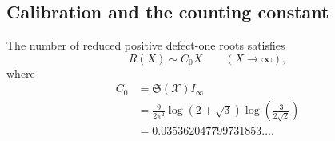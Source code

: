 \subsection{Calibration and the counting constant}
\label{koide-count-subsec-calibration}

\begin{theorem}
\label{koide-count-thm-linear-asymptotic}
The number of reduced positive defect-one roots satisfies
\begin{equation}
 R(X)\sim C_0X\qquad(X\to\infty),
 \label{koide-count-eq-final-asymptotic}
\end{equation}
where
\begin{equation}
 \begin{aligned}
 C_0
 &=\mathfrak S(\mathscr X)I_\infty\\
 &=\frac9{2\pi^2}\log(2+\sqrt3)
   \log\!\left(\frac3{2\sqrt2}\right)\\
 &=0.035362047799731853\ldots.
 \end{aligned}
 \label{koide-count-eq-final-constant}
\end{equation}
\end{theorem}

